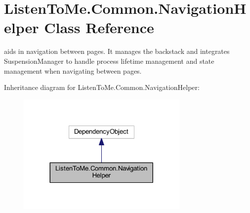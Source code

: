 \hypertarget{class_listen_to_me_1_1_common_1_1_navigation_helper}{}\section{Listen\+To\+Me.\+Common.\+Navigation\+Helper Class Reference}
\label{class_listen_to_me_1_1_common_1_1_navigation_helper}


aids in navigation between pages. It manages the backstack and integrates Suspension\+Manager to handle process lifetime management and state management when navigating between pages.  




Inheritance diagram for Listen\+To\+Me.\+Common.\+Navigation\+Helper\+:\nopagebreak
\begin{figure}[H]
\begin{center}
\leavevmode
\includegraphics[width=236pt]{class_listen_to_me_1_1_common_1_1_navigation_helper__inherit__graph}
\end{center}
\end{figure}
